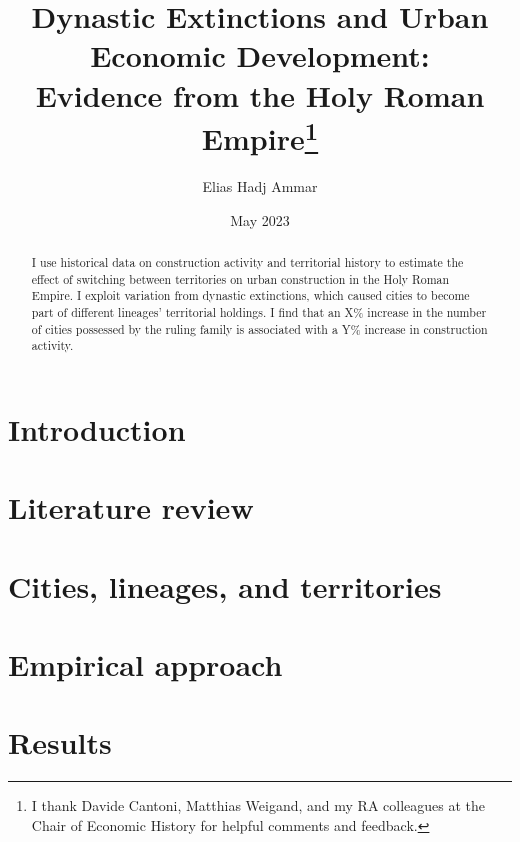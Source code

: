 \documentclass{article}
\title{Dynastic Extinctions and Urban Economic Development: \\Evidence from the Holy Roman Empire\footnote{I thank Davide Cantoni, Matthias Weigand, and my RA colleagues at the Chair of Economic History for helpful comments and feedback.}
}
\author{Elias Hadj Ammar}
\date{May 2023}
\begin{document}
\onehalfspacing
\maketitle
\thispagestyle{empty}

\begin{abstract}
I use historical data on construction activity and territorial history to estimate the effect of switching between territories on urban construction in the Holy Roman Empire. I exploit variation from dynastic extinctions, which caused cities to become part of different lineages' territorial holdings. I find that an X\% increase in the number of cities possessed by the ruling family is associated with a Y\% increase in construction activity.
\end{abstract}




\newpage

\setcounter{page}{1}
\doublespacing

 
\section{Introduction}



\section{Literature review}



\section{Cities, lineages, and territories}



\section{Empirical approach}



\section{Results}
\end{document}
